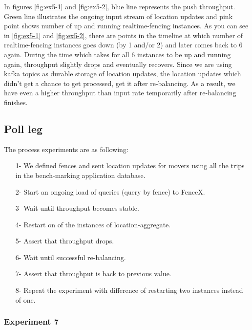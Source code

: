 \documentclass[a4]{report}
\begin{document}
        In figures \ref{fig:ex5-1} and \ref{fig:ex5-2}, blue line represents the push throughput.
        Green line illustrates the ongoing input stream of location updates and pink point shows
        number of up and running realtime-fencing instances.
        As you can see in \ref{fig:ex5-1} and \ref{fig:ex5-2}, there are points in the timeline at which number of
        realtime-fencing instances goes down (by 1 and/or 2) and later comes back to 6 again.
        During the time which takes for all 6 instances to be up and running again, throughput slightly drops and
        eventually recovers.
        Since we are using kafka topics as durable storage of location updates, the location updates which
        didn't get a chance to get processed, get it after re-balancing.
        As a result, we have even a higher throughput than input rate temporarily after re-balancing finishes.

        \subsection{Poll leg}
        The process experiments are as following:
        \begin{itemize}
            \item[1-] We defined fences and sent location updates for movers using all the trips in the bench-marking
            application database.
            \item[2-] Start an ongoing load of queries (query by fence) to FenceX.
            \item[3-] Wait until throughput becomes stable.
            \item[4-] Restart on of the instances of location-aggregate.
            \item[5-] Assert that throughput drops.
            \item[6-] Wait until successful re-balancing.
            \item[7-] Assert that throughput is back to previous value.
            \item[8-] Repeat the experiment with difference of restarting two instances instead of one.
        \end{itemize}

        \clearpage

        \subsubsection{Experiment 7}
\end{document}
